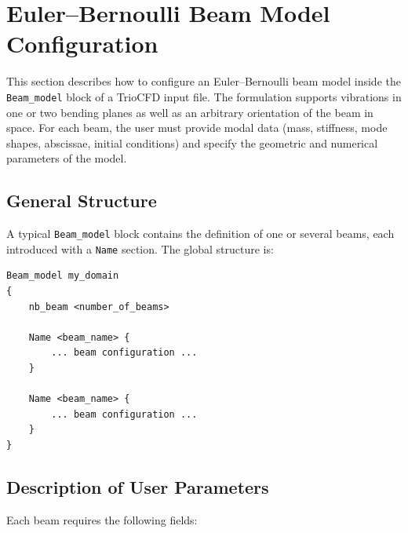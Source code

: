 


\section{Euler--Bernoulli Beam Model Configuration}

This section describes how to configure an Euler--Bernoulli beam model inside
the \texttt{Beam\_model} block of a TrioCFD input file.
The formulation supports vibrations in one or two bending planes as well as an
arbitrary orientation of the beam in space.  
For each beam, the user must provide modal data (mass, stiffness, mode shapes,
abscissae, initial conditions) and specify the geometric and numerical
parameters of the model.

\subsection*{General Structure}

A typical \texttt{Beam\_model} block contains the definition of one or several
beams, each introduced with a \texttt{Name} section.  
The global structure is:

\begin{lstlisting}
Beam_model my_domain
{
    nb_beam <number_of_beams>

    Name <beam_name> {
        ... beam configuration ...
    }

    Name <beam_name> {
        ... beam configuration ...
    }
}
\end{lstlisting}

\subsection*{Description of User Parameters}

Each beam requires the following fields:

